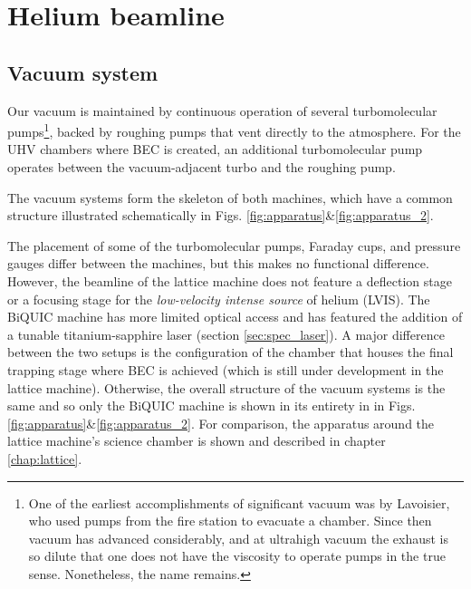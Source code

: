 \section{Helium beamline}

\subsection{Vacuum system}
	Our vacuum is maintained by continuous operation of several turbomolecular pumps\footnote{One of the earliest accomplishments of significant vacuum was by Lavoisier, who used pumps from the fire station to evacuate a chamber.
	Since then vacuum has advanced considerably, and at ultrahigh vacuum the exhaust is so dilute that one does not have the viscosity to operate pumps in the true sense.
	Nonetheless, the name remains.}, backed by roughing pumps that vent directly to the atmosphere.
	For the UHV chambers where BEC is created, an additional turbomolecular pump operates between the vacuum-adjacent turbo and the roughing pump.
	
	The vacuum systems form the skeleton of both machines, which have a common structure illustrated schematically in Figs. \ref{fig:apparatus}\&\ref{fig:apparatus_2}.


	

	The placement of some of the turbomolecular pumps, Faraday cups, and pressure gauges differ between the machines, but this makes no functional difference.
	However, the beamline of the lattice machine does not feature a deflection stage or a focusing stage for the \emph{low-velocity intense source} of helium (LVIS).
	The BiQUIC machine has more limited optical access and has featured the addition of a tunable titanium-sapphire laser (section \ref{sec:spec_laser}).
	A major difference between the two setups is the configuration of the chamber that houses the final trapping stage where BEC is achieved (which is still under development in the lattice machine).
	Otherwise, the overall structure of the vacuum systems is the same and so only the BiQUIC machine is shown in its entirety in in Figs. \ref{fig:apparatus}\&\ref{fig:apparatus_2}.
	For comparison, the apparatus around the lattice machine's science chamber is shown and described in chapter \ref{chap:lattice}.


